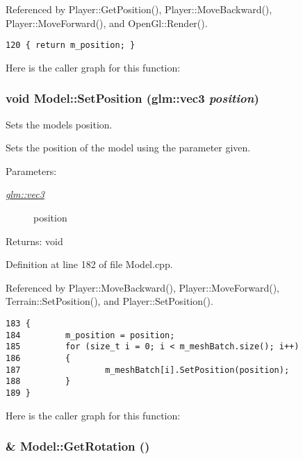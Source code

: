 Referenced by Player::GetPosition(), Player::MoveBackward(), Player::MoveForward(), and OpenGl::Render().

\begin{Code}\begin{verbatim}120 { return m_position; }
\end{verbatim}
\end{Code}




Here is the caller graph for this function:\hypertarget{class_model_3a615a604e26270bd0849462718703b2}{
\subsubsection[SetPosition]{\setlength{\rightskip}{0pt plus 5cm}void Model::SetPosition ({\bf glm::vec3} {\em position})}}
\label{class_model_3a615a604e26270bd0849462718703b2}


Sets the models position. 

Sets the position of the model using the parameter given.

\begin{Desc}
\item[Parameters:]
\begin{description}
\item[{\em \hyperlink{group__core__types_g1c47e8b3386109bc992b6c48e91b0be7}{glm::vec3}}]position \end{description}
\end{Desc}
\begin{Desc}
\item[Returns:]void \end{Desc}


Definition at line 182 of file Model.cpp.

Referenced by Player::MoveBackward(), Player::MoveForward(), Terrain::SetPosition(), and Player::SetPosition().

\begin{Code}\begin{verbatim}183 {
184         m_position = position;
185         for (size_t i = 0; i < m_meshBatch.size(); i++)
186         {
187                 m_meshBatch[i].SetPosition(position);
188         }
189 }
\end{verbatim}
\end{Code}




Here is the caller graph for this function:\hypertarget{class_model_fc6593eeb0980053628cd00a75be51e9}{
\subsubsection[GetRotation]{\& Model::GetRotation ()}}
\label{class_model_fc6593eeb0980053628cd00a75be51e9}


